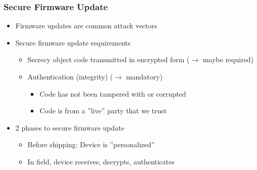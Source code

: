 \subsubsection{Secure Firmware Update}
\begin{itemize}
  \item Firmware updates are common attack vectors
  \item Secure firmware update requirements
        \begin{itemize}
          \item Secrecy {\textemdash} object code transmitted in encrypted form ($\rightarrow$ maybe required)
          \item Authentication (integrity) ($\rightarrow$ mandatory)
                \begin{itemize}
                  \item Code has not been tampered with or corrupted
                  \item Code is from a ''live'' party that we trust
                \end{itemize}
        \end{itemize}
  \item 2 phases to secure firmware update
        \begin{itemize}
          \item Before shipping: Device is ''personalized''
          \item In field, device receives, decrypts, authenticates
        \end{itemize}
\end{itemize}

